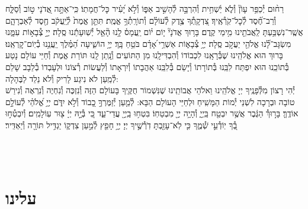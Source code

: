 \documentclass[twoside, openany, parskip=half, 11pt]{book}
\begin{document}
%
רַח֨וּם יְ֯כַפֵּ֥ר עָוֹן֘ וְ֯לֹ֢א יַ֫שְׁחִ֥ית וְ֯הִרְבָּ֣ה לְ֯הָשִׁ֣יב אַפּ֑וֹ וְ֯לֹ֣א יָ֝עִ֗יר כׇּל־חֲמָתֽוֹ׃ כִּֽי־אַתָּ֣ה
%
אֲ֭דֹנָי ט֣וֹב וְ֯סַלָּ֑ח וְ֯רַב־חֶ֝֗סֶד לְ֯כׇל־קֹֽרְ֯אֶֽיךָ׃ צִ֭דְקָֽתְ֯ךָ
%
צֶ֥דֶק לְ֯עוֹלָ֗ם וְ֯תוֹרָֽתְ֯ךָ֥ אֱמֶֽת׃ תִּתֵּ֤ן
%
אֱמֶת֙ לְ֯יַֽעֲקֹ֔ב חֶ֖סֶד לְ֯אַבְרָהָ֑ם אֲשֶֽׁר־נִשְׁבַּ֥עְתָּ לַֽאֲבֹתֵ֖ינוּ מִ֥ימֵי קֶֽדֶם׃ בָּר֥וּךְ
%
אֲדֹנָי֘ י֤וֹם י֗וֹם יַֽעֲמָס֫ לָ֥נוּ הָ֘אֵ֤ל יְ֯שֽׁוּעָתֵ֬נוּ סֶֽלָה׃ יְיָ֣
%
צְ֯בָא֣וֹת עִמָּ֑נוּ מִשְׂגָּב־לָ֝֗נוּ אֱלֹהֵ֖י יַעֲקֹ֣ב סֶֽלָה׃ יְיָ֥
%
צְ֯בָא֑וֹת אַשְׁרֵ֥י ֝אָדָ֗ם בֹּטֵ֥חַ בָּֽךְ׃ יְיָ֥
%
הוֹשִׁ֑יעָה הַ֝מֶּ֗לֶךְ יַֽעֲנֵ֥נוּ בְ֯יֽוֹם־קׇרְאֵֽנוּ׃ \\
בָּרוּךְ הוּא אֱלֹהֵֽינוּ שֶׁבְּ֯רָאָֽנוּ לִכְבוֹדוֹ וְ֯הִבְדִּילָֽנוּ מִן הַתּוֹעִים וְ֯נָֽתַן לָֽנוּ תּוֹרַת אֱמֶת וְ֯חַיֵּי עוֹלָם נָטַע בְּ֯תוֹכֵֽנוּ הוּא יִפְתַּח לִבֵּֽנוּ בְּ֯תוֹרָתוֹ וְ֯יָשֵׂם בְּ֯לִבֵּֽנוּ אַהֲבָתוֹ וְ֯יִרְאָתוֹ וְ֯לַעֲשׂוֹת רְ֯צוֹנוֹ וּלְעָבְדוֹ בְ֯לֵבָב שָׁלֵם לְ֯מַֽעַן לֹא נִיגַע לָרִיק וְ֯לֹא נֵלֵד לַבֶּהָלָה:\\
יְ֯הִי רָצוֹן מִלְּ֯פָנֶֽיךָ יְיָ אֱלֹהֵֽינוּ וֵאלֹהֵי אֲבוֹתֵֽינוּ שֶׁנִּשְׁמוֹר חֻקֶּֽיךָ בָּעוֹלָם הַזֶּה וְ֯נִזְכֶּה וְ֯נִחְיֶה וְ֯נִרְאֶה וְ֯נִירַשׁ טוֹבָה וּבְרָכָה לִשְׁנֵי יְ֯מוֹת הַמָּשִֽׁיחַ וּלְחַיֵּי הָעוֹלָם הַבָּא: לְ֯מַ֤עַן יְ֯זַמֶּרְךָ֣ כָ֭בוֹד וְ֯לֹ֣א יִדֹּ֑ם יְיָ֥ אֱ֝לֹהַ֗י לְ֯עוֹלָ֣ם אוֹדֶֽךָּ׃ בָּר֣וּךְ֯ הַגֶּ֔בֶר אֲשֶׁ֥ר יִבְטַ֖ח בַּֽיְיָ֑ וְ֯הָיָ֥ה יְיָ֖ מִבְטַחֽוֹ׃ בִּטְח֥וּ
%
בַֽיְיָ֖ עֲדֵי־עַ֑ד כִּ֚י בְּ֯יָ֣הּ יְיָ֔ צ֖וּר עֽוֹלָמִֽים׃  וְ֯יִבְטְ֯ח֣וּ
%
בְ֭֯ךָ יֽוֹדְ֯עֵ֣י שְׁ֯מֶ֑ךָ כִּ֤י לֹֽא־עָזַ֖בְתָּ דֹֽרְ֯שֶׁ֣יךָ יְיָ׃ יְיָ֥
%
חָפֵ֖ץ לְ֯מַ֣עַן צִדְק֑וֹ יַגְדִּ֥יל תּוֹרָ֖ה וְ֯יַאְדִּֽיר׃

\fullkaddish

\vfill

\\
\\

\clearpage
\section*{ עלינו }

\aleinu

\end{document}
